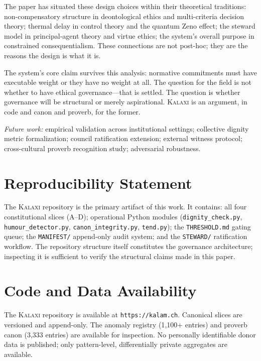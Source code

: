 \documentclass[12pt,a4paper]{article}
\theoremstyle{definition}
\theoremstyle{remark}
\newcommand{\kalaxi}{\textsc{Kalaxi}}
\begin{document}
The paper has situated these design choices within their theoretical traditions:
non-compensatory structure in deontological ethics and multi-criteria decision theory;
thermal delay in control theory and the quantum Zeno effect; the steward model in
principal-agent theory and virtue ethics; the system's overall purpose in constrained
consequentialism. These connections are not post-hoc; they are the reasons the design
is what it is.

The system's core claim survives this analysis: normative commitments must have
executable weight or they have no weight at all. The question for the field is not
whether to have ethical governance—that is settled. The question is whether governance
will be structural or merely aspirational. \kalaxi{} is an argument, in code and
canon and proverb, for the former.

\bigskip
\noindent\textit{Future work:} empirical validation across institutional settings;
collective dignity metric formalization; council ratification extension; external
witness protocol; cross-cultural proverb recognition study; adversarial robustness.

\section*{Reproducibility Statement}
\label{sec:reproducibility}

The \kalaxi{} repository is the primary artifact of this work. It contains:
all four constitutional slices (A--D); operational Python modules
(\texttt{dignity\_check.py}, \texttt{humour\_detector.py}, \texttt{canon\_integrity.py},
\texttt{tend.py}); the \texttt{THRESHOLD.md} gating queue; the \texttt{MANIFEST/}
append-only audit system; and the \texttt{STEWARD/} ratification workflow. The
repository structure itself constitutes the governance architecture; inspecting it
is sufficient to verify the structural claims made in this paper.

\section*{Code and Data Availability}
\label{sec:code}

The \kalaxi{} repository is available at \texttt{https://kalam.ch}. Canonical slices
are versioned and append-only. The anomaly registry (1{,}100+ entries) and proverb
canon (3{,}333 entries) are available for inspection. No personally identifiable
donor data is published; only pattern-level, differentially private aggregates are
available.
\end{document}

